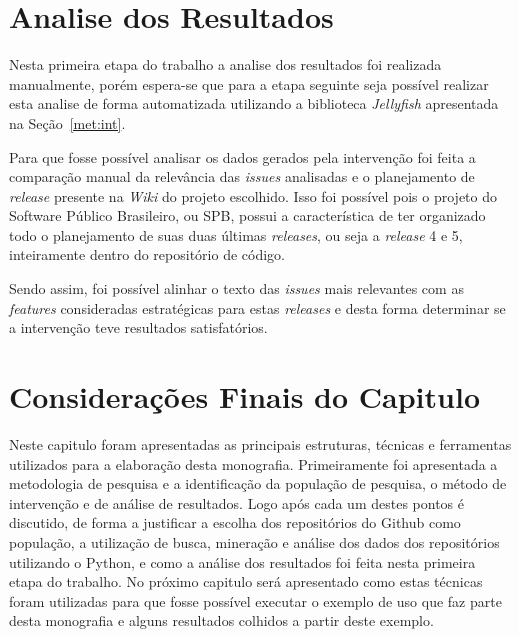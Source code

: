 \section{Analise dos Resultados}
\label{met:res}

Nesta primeira etapa do trabalho a analise dos resultados foi realizada manualmente, porém espera-se que para a etapa seguinte seja possível realizar esta analise de forma automatizada utilizando a biblioteca \textit{Jellyfish} apresentada na Seção~\ref{met:int}.

Para que fosse possível analisar os dados gerados pela intervenção foi feita a comparação manual da relevância das \textit{issues} analisadas e o planejamento de \textit{release} presente na \textit{Wiki} do projeto escolhido. Isso foi possível pois o projeto do Software Público Brasileiro, ou SPB, possui a característica de ter organizado todo o planejamento de suas duas últimas \textit{releases}, ou seja a \textit{release} 4 e 5, inteiramente dentro do repositório de código.

Sendo assim, foi possível alinhar o texto das \textit{issues} mais relevantes com as \textit{features} consideradas estratégicas para estas \textit{releases} e desta forma determinar se a intervenção teve resultados satisfatórios.

\section{Considerações Finais do Capitulo}
Neste capitulo foram apresentadas as principais estruturas, técnicas e ferramentas utilizados para a elaboração desta monografia. Primeiramente foi apresentada a metodologia de pesquisa e a identificação da população de pesquisa, o método de intervenção e de análise de resultados. Logo após cada um destes pontos é discutido, de forma a justificar a escolha dos repositórios do Github como população, a utilização de busca, mineração e análise dos dados dos repositórios utilizando o Python, e como a análise dos resultados foi feita nesta primeira etapa do trabalho. No próximo capitulo será apresentado como estas técnicas foram utilizadas para que fosse possível executar o exemplo de uso que faz parte desta monografia e alguns resultados colhidos a partir deste exemplo.


